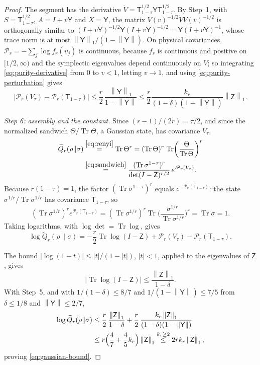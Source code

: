 \documentclass[11pt]{amsart}
\numberwithin{equation}{section}
\theoremstyle{definition}
\newcommand{\Qtil}{\widetilde Q}
\newcommand{\Tr}{\operatorname{Tr}}
\newcommand{\norm}[1]{\left\|#1\right\|}
\begin{document}
\begin{proof}
The segment has the derivative
\(\dot V=\mathsf T_{1-\tau}^{1/2}\mathsf Y\mathsf T_{1-\tau}^{1/2}\).
By Step~1, with \(S=\mathsf T_{1-\tau}^{1/2}\), \(A=I+v\mathsf Y\) and
\(X=\mathsf Y\), the matrix \(V(v)^{-1/2}\dot VV(v)^{-1/2}\) is
orthogonally similar to
\((I+v\mathsf Y)^{-1/2}\mathsf Y(I+v\mathsf Y)^{-1/2}
=\mathsf Y(I+v\mathsf Y)^{-1}\), whose trace norm is at most
\(\norm{\mathsf Y}_1/(1-\norm{\mathsf Y})\). On physical covariances,
\(\mathscr P_r=-\sum_j\log f_r(\upsilon_j)\) is
continuous, because \(f_r\) is continuous and positive on
\([1/2,\infty)\) and the symplectic eigenvalues depend continuously on \(V\); so
integrating
\eqref{eq:purity-derivative} from \(0\) to \(v<1\), letting \(v\to1\), and
using \eqref{eq:purity-perturbation} gives
\[
 |\mathscr P_r(V_\tau)-\mathscr P_r(\mathsf T_{1-\tau})|
 \le\frac r2\,\frac{\norm{\mathsf Y}_1}{1-\norm{\mathsf Y}}
 \le
 \frac r2
 \frac{k_r}{(1-\delta)(1-\norm{\mathsf Y})}
 \norm{\mathsf Z}_1.
\]

\smallskip
\emph{Step 6: assembly and the constant.} Since \((r-1)/(2r)=\tau/2\),
and since the normalized sandwich \(\Theta/{\Tr\Theta}\), a Gaussian
state, has covariance \(V_\tau\),
\begin{align*}
 \Qtil_r(\rho\|\sigma)
 &\overset{\eqref{eq:renyi}}{=}\Tr\Theta^r
 =(\Tr\Theta)^r\,\Tr\biggl(\frac{\Theta}{\Tr\Theta}\biggr)^r\\
 &\overset{\eqref{eq:sandwich}}{=}
 \frac{(\Tr\sigma^{1-\tau})^r}{\det(I-\mathsf Z)^{r/2}}\,
 e^{\mathscr P_r(V_\tau)}.
\end{align*}
Because \(r(1-\tau)=1\), the factor \((\Tr\sigma^{1-\tau})^r\) equals
\(e^{-\mathscr P_r(\mathsf T_{1-\tau})}\): the state
\(\sigma^{1/r}/{\Tr\sigma^{1/r}}\) has covariance \(\mathsf T_{1-\tau}\),
so
\[
 (\Tr\sigma^{1/r})^re^{\mathscr P_r(\mathsf T_{1-\tau})}
 =(\Tr\sigma^{1/r})^r
 \Tr\biggl(\frac{\sigma^{1/r}}{\Tr\sigma^{1/r}}\biggr)^r=\Tr\sigma=1.
\]
Taking logarithms, with \(\log\det=\Tr\log\), gives
\[
 \log\Qtil_r(\rho\|\sigma)
 =-\frac r2\Tr\log(I-\mathsf Z)
  +\mathscr P_r(V_\tau)-\mathscr P_r(\mathsf T_{1-\tau}).
\]

The bound \(\lvert\log(1-t)\rvert\le|t|/(1-|t|)\), \(|t|<1\), applied to the
eigenvalues of \(\mathsf Z\), gives
\[
 \lvert\Tr\log(I-\mathsf Z)\rvert
 \le\frac{\norm{\mathsf Z}_1}{1-\delta}.
\]
With Step~5, and with \(1/(1-\delta)\le8/7\) and
\(1/(1-\norm{\mathsf Y})\le7/5\) from \(\delta\le1/8\) and
\(\norm{\mathsf Y}\le2/7\),
\begin{align*}
 \log\Qtil_r(\rho\|\sigma)
 &\le\frac r2\,\frac{\norm{\mathsf Z}_1}{1-\delta}
 +\frac r2\,\frac{k_r\norm{\mathsf Z}_1}{(1-\delta)(1-\norm{\mathsf Y})}\\
 &\le r\Bigl(\frac47+\frac45k_r\Bigr)\norm{\mathsf Z}_1
 \overset{k_r\ge2}{\le}2rk_r\norm{\mathsf Z}_1,
\end{align*}
proving \eqref{eq:gaussian-bound}.
\end{proof}
\end{document}
